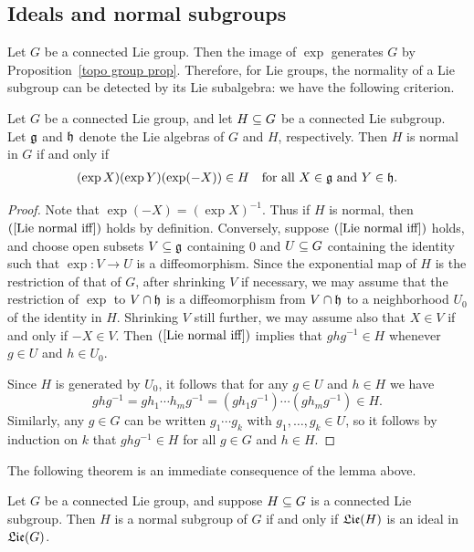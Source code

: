 \subsection{Ideals and normal subgroups}
Let $G$ be a connected Lie group. Then the image of $\exp$ generates $G$ by Proposition~\ref{topo group prop}. Therefore, for Lie groups, the normality of a Lie subgroup can be detected by its Lie subalgebra: we have the following criterion.
\begin{lemma}
Let $G$ be a connected Lie group, and let $H\subseteq G$ be a connected Lie subgroup. Let $\mathfrak{g}$ and $\mathfrak{h}$ denote the Lie algebras of $G$ and $H$, respectively. Then $H$ is
normal in $G$ if and only if
\begin{align}\label{Lie normal iff}
(\exp X)(\exp Y)(\exp(-X))\in H\quad\text{for all $X\in\mathfrak{g}$ and $Y\in\mathfrak{h}$}.
\end{align}
\end{lemma}
\begin{proof}
Note that $\exp(-X)=(\exp X)^{-1}$. Thus if $H$ is normal, then $(\ref{Lie normal iff})$ holds by definition. Conversely, suppose $(\ref{Lie normal iff})$ holds, and choose open subsets $V\subseteq\mathfrak{g}$ containing $0$ and $U\subseteq G$ containing the identity such that $\exp:V\to U$ is a diffeomorphism. Since the exponential map of $H$ is the restriction of that of $G$, after shrinking $V$ if necessary, we may assume that the restriction of $\exp$ to $V\cap\mathfrak{h}$ is a diffeomorphism from $V\cap\mathfrak{h}$ to a neighborhood $U_0$ of the identity in $H$. Shrinking $V$ still further, we may assume also that $X\in V$ if and only if $-X\in V$. Then $(\ref{Lie normal iff})$ implies that $ghg^{-1}\in H$ whenever $g\in U$ and $h\in U_0$.\par
Since $H$ is generated by $U_0$, it follows that for any $g\in U$ and $h\in H$ we have
\[ghg^{-1}=gh_1\cdots h_mg^{-1}=(gh_1g^{-1})\cdots(gh_mg^{-1})\in H.\]
Similarly, any $g\in G$ can be written $g_1\cdots g_k$ with $g_1,\dots,g_k\in U$, so it follows by induction on $k$ that $ghg^{-1}\in H$ for all $g\in G$ and $h\in H$.
\end{proof}
The following theorem is an immediate consequence of the lemma above.
\begin{theorem}
Let $G$ be a connected Lie group, and suppose $H\subseteq G$ is a connected Lie subgroup. Then $H$ is a normal subgroup of $G$ if and only if $\mathfrak{Lie}(H)$ is an ideal in $\mathfrak{Lie}(G)$.
\end{theorem}
